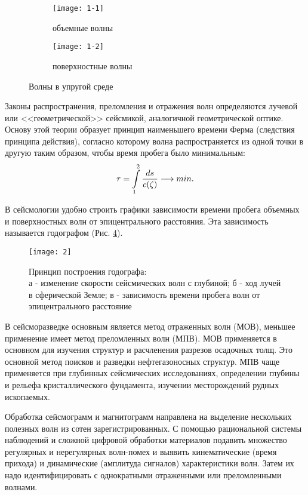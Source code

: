 \begin{figure}[H]
	\centering
	\begin{subfigure}{.6\textwidth}
		\texttt{[image: 1-1]}
		\caption{объемные волны}
		\label{1-1}
	\end{subfigure}
	\begin{subfigure}{.6\textwidth}
		\texttt{[image: 1-2]}
		\caption{поверхностные волны}
		\label{1-2}
	\end{subfigure}
	\caption{Волны в упругой среде}
	\label{1}
\end{figure}



Законы распространения, преломления и отражения волн определяются лучевой или <<геометрической>> сейсмикой, аналогичной геометрической оптике. Основу этой теории образует принцип наименьшего времени Ферма (следствия принципа действия), согласно которому волна распространяется из одной точки в другую таким образом, чтобы время пробега было минимальным:
\begin{equation}
	\tau = \int\displaylimits_{1}^{2} \dfrac{ds}{c(\zeta)} \longrightarrow min.
\end{equation}

В сейсмологии удобно строить графики зависимости времени пробега объемных и поверхностных волн от эпицентрального расстояния. Эта зависимость называется годографом (Рис. \ref{2}).

\begin{figure}[H]
	\centering
	\texttt{[image: 2]}
	\caption{Принцип построения годографа:\\а - изменение скорости сейсмических волн с глубиной; б - ход лучей в сферической Земле; в - зависимость времени пробега волн от эпицентрального расстояние}
	\label{2}
\end{figure}

В сейсморазведке основным является метод отраженных волн (МОВ), меньшее применение имеет метод преломленных волн (МПВ). МОВ применяется в основном для изучения структур и расчленения разрезов осадочных толщ. Это основной метод поисков и разведки нефтегазоносных структур. МПВ чаще применяется при глубинных сейсмических исследованиях, определении глубины и рельефа кристаллического фундамента, изучении месторождений рудных ископаемых.

Обработка сейсмограмм и магнитограмм направлена на выделение нескольких полезных волн из сотен зарегистрированных. С помощью рациональной системы наблюдений и сложной цифровой обработки материалов подавить множество регулярных и нерегулярных волн-помех и выявить кинематические (время прихода) и динамические (амплитуда сигналов) характеристики волн. Затем их надо идентифицировать с однократными отраженными или преломленными волнами.

